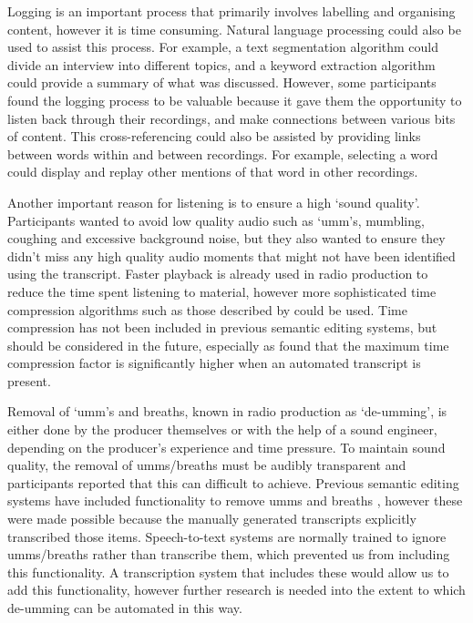 Logging is an important process that primarily involves labelling and organising content, however it is time consuming.
Natural language processing could also be used to assist this process. For example, a text segmentation algorithm
\citep{Choi2000} could divide an interview into different topics, and a keyword extraction algorithm \citep{Matsuo2004}
could provide a summary of what was discussed. However, some participants found the logging process to be valuable
because it gave them the opportunity to listen back through their recordings, and make connections between various bits
of content. This cross-referencing could also be assisted by providing links between words within and between
recordings. For example, selecting a word could display and replay other mentions of that word in other recordings.

Another important reason for listening is to ensure a high `sound quality'. Participants wanted to avoid low quality
audio such as `umm's, mumbling, coughing and excessive background noise, but they also wanted to ensure they didn't
miss any high quality audio moments that might not have been identified using the transcript.  Faster playback is
already used in radio production to reduce the time spent listening to material, however more sophisticated time
compression algorithms such as those described by \citet{Arons1997} could be used. Time compression has not been
included in previous semantic editing systems, but should be considered in the future, especially as \citet{Vemuri2004}
found that the maximum time compression factor is significantly higher when an automated transcript is present.

Removal of `umm's and breaths, known in radio production as `de-umming', is either done by the producer themselves or
with the help of a sound engineer, depending on the producer's experience and time pressure. To maintain sound quality,
the removal of umms/breaths must be audibly transparent and participants reported that this can difficult to achieve.
Previous semantic editing systems have included functionality to remove umms \citep{Berthouzoz2012} and breaths
\citep{Rubin2013}, however these were made possible because the manually generated transcripts 
explicitly transcribed those items. Speech-to-text systems are normally trained to ignore umms/breaths rather than
transcribe them, which prevented us from including this functionality. A transcription system that includes these would
allow us to add this functionality, however further research is needed into the extent to which de-umming can be
automated in this way.

